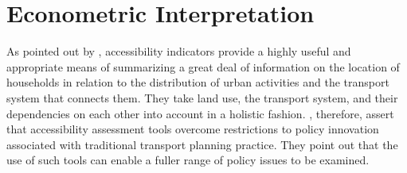 \section{Econometric Interpretation}
As pointed out by \citet{MorrisEtAl1979AccessibilityIndicators}, accessibility indicators provide a highly
useful and appropriate means of summarizing a great deal of information on the location of households in relation to 
the distribution of urban activities and the transport system that connects them.
%
%
They take land use, the transport system, and their dependencies on each other into
account in a holistic fashion.
%
%
\citet{CurtisEtAl2013AccessibilityPolicyInnovation}, therefore, assert that accessibility assessment tools overcome
restrictions to policy innovation associated with traditional transport planning practice. They point out that the use of
such tools can enable a fuller range of policy issues to be examined.


